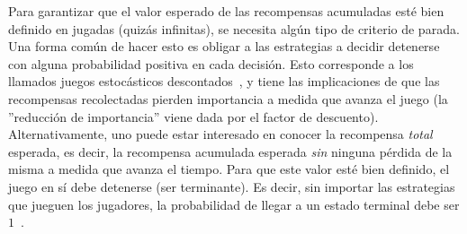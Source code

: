 Para garantizar que el valor esperado de las recompensas acumuladas esté bien definido en jugadas (quizás infinitas), se necesita algún tipo de criterio de parada. Una forma común de hacer esto es obligar a las estrategias a decidir detenerse con alguna probabilidad positiva en cada decisión. Esto corresponde a los llamados juegos estocásticos descontados~\cite{Shapley1095,FilarV96}, y tiene las implicaciones de que las recompensas recolectadas pierden importancia a medida que avanza el juego (la ''reducción de importancia'' viene dada por el factor de descuento). Alternativamente, uno puede estar interesado en conocer la recompensa \emph{total} esperada, es decir, la recompensa acumulada esperada \emph{sin} ninguna pérdida de la misma a medida que avanza el tiempo. Para que este valor esté bien definido, el juego en sí debe detenerse (ser terminante). Es decir, sin importar las estrategias que jueguen los jugadores, la probabilidad de llegar a un estado terminal debe ser $1$~\cite{Condon90,FilarV96}.
